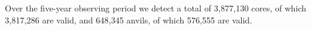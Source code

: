 Over the five-year observing period we detect a total of 3,877,130 cores, of which 3,817,286 are valid, and 648,345 anvils, of which 576,555 are valid.






